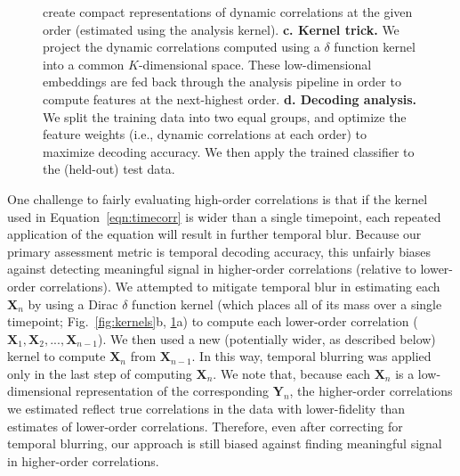 \documentclass[english]{article}
\begin{document}
\begin{figure}[tp]
{    create compact representations of dynamic correlations at the
    given order (estimated using the analysis kernel).
    \textbf{c. Kernel trick.} We project the dynamic correlations
    computed using a $\delta$ function kernel into a common
    $K$-dimensional space.  These low-dimensional embeddings are fed
    back through the analysis pipeline in order to compute features at
    the next-highest order.  \textbf{d. Decoding analysis.} We split
    the training data into two equal groups, and optimize the feature
    weights (i.e., dynamic correlations at each order) to maximize
    decoding accuracy.  We then apply the trained classifier to the
    (held-out) test data.
  \label{fig:pipeline}}
\end{figure}


One challenge to fairly evaluating high-order correlations is that if
the kernel used in Equation~\ref{eqn:timecorr} is wider than a single
timepoint, each repeated application of the equation will result in
further temporal blur.  Because our primary assessment metric is
temporal decoding accuracy, this unfairly biases against detecting
meaningful signal in higher-order correlations (relative to
lower-order correlations).  We attempted to mitigate temporal blur in
estimating each $\mathbf{X}_n$ by using a Dirac $\delta$ function
kernel (which places all of its mass over a single timepoint;
Fig.~\ref{fig:kernels}b, \ref{fig:pipeline}a) to compute each lower-order correlation
($\mathbf{X}_1, \mathbf{X}_2, ..., \mathbf{X}_{n-1}$).  We then used a
new (potentially wider, as described below) kernel to compute
$\mathbf{X}_{n}$ from $\mathbf{X}_{n-1}$.  In this way, temporal
blurring was applied only in the last step of computing
$\mathbf{X}_n$.  We note that, because each $\mathbf{X}_n$ is a
low-dimensional representation of the corresponding $\mathbf{Y}_n$,
the higher-order correlations we estimated reflect true correlations
in the data with lower-fidelity than estimates of lower-order
correlations.  Therefore, even after correcting for temporal blurring,
our approach is still biased against finding meaningful signal in
higher-order correlations.
\end{document}
